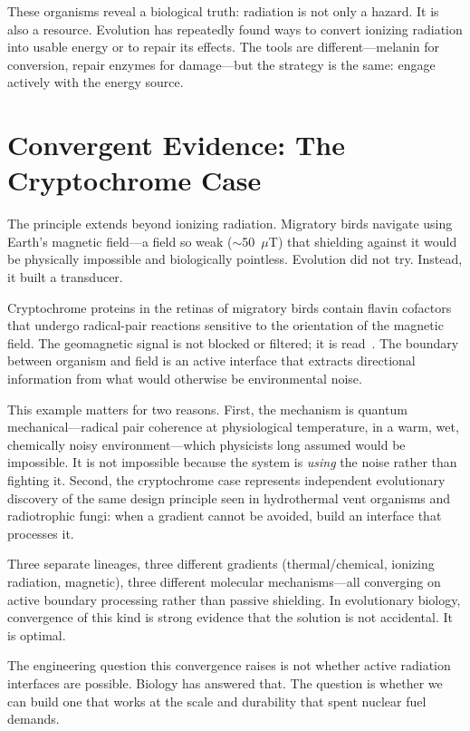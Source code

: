 \documentclass[12pt]{article}
\begin{document}
These organisms reveal a biological truth: radiation is not only a hazard. It is also a
resource. Evolution has repeatedly found ways to convert ionizing radiation into usable
energy or to repair its effects. The tools are different---melanin for conversion, repair
enzymes for damage---but the strategy is the same: engage actively with the energy source.

\section{Convergent Evidence: The Cryptochrome Case}

The principle extends beyond ionizing radiation. Migratory birds navigate using Earth's
magnetic field---a field so weak ($\sim$50~$\mu$T) that shielding against it would be
physically impossible and biologically pointless. Evolution did not try. Instead, it built
a transducer.

Cryptochrome proteins in the retinas of migratory birds contain flavin cofactors that
undergo radical-pair reactions sensitive to the orientation of the magnetic field. The
geomagnetic signal is not blocked or filtered; it is read~\cite{ritz2000,hore2016}. The
boundary between organism and field is an active interface that extracts directional
information from what would otherwise be environmental noise.

This example matters for two reasons. First, the mechanism is quantum mechanical---radical
pair coherence at physiological temperature, in a warm, wet, chemically noisy
environment---which physicists long assumed would be impossible. It is not impossible
because the system is \emph{using} the noise rather than fighting it. Second, the
cryptochrome case represents independent evolutionary discovery of the same design
principle seen in hydrothermal vent organisms and radiotrophic fungi: when a gradient
cannot be avoided, build an interface that processes it.

Three separate lineages, three different gradients (thermal/chemical, ionizing radiation,
magnetic), three different molecular mechanisms---all converging on active boundary
processing rather than passive shielding. In evolutionary biology, convergence of this
kind is strong evidence that the solution is not accidental. It is optimal.

The engineering question this convergence raises is not whether active radiation interfaces
are possible. Biology has answered that. The question is whether we can build one that
works at the scale and durability that spent nuclear fuel demands.
\end{document}
